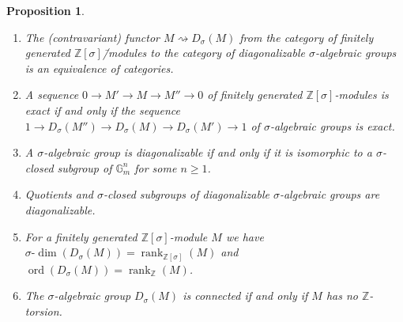\documentclass[oneside,reqno]{amsart}
\newtheorem{prop}[theo]{Proposition}
\theoremstyle{definition}
\newcommand{\sdim}{\sigma\text{-}\dim}
\newcommand{\ord}{\operatorname{ord}}
\newcommand{\s}{\sigma}
\newcommand{\Gm}{\mathbb{G}_m}
\newcommand{\ZZ}{\mathbb{Z}}
\newcommand{\rank}{\operatorname{rank}}
\begin{document}
\begin{prop} \label{prop: all about diagonalizable}\mbox{}
	\begin{enumerate}
		\item The (contravariant) functor $M\rightsquigarrow D_\s(M)$ from the category of finitely generated $\ZZ[\s]$\=/modules to the category of diagonalizable $\s$-algebraic groups is an equivalence of categories.	
		\item A sequence $0\to M'\to M\to M''\to 0$ of finitely generated $\ZZ[\s]$-modules is exact if and only if the sequence $1\to D_\s(M'')\to D_\s(M)\to D_\s(M')\to 1$ of $\s$-algebraic groups is exact. 
		\item A $\s$-algebraic group is diagonalizable if and only if it is isomorphic to a $\s$-closed subgroup of $\Gm^n$ for some $n\geq 1$.
		\item Quotients and $\s$-closed subgroups of diagonalizable $\s$-algebraic groups are diagonalizable.
		\item For a finitely generated $\ZZ[\s]$-module $M$ we have $\sdim(D_\s(M))=\rank_{\ZZ[\s]}(M)$ and $\ord(D_\s(M))=\rank_\ZZ(M)$.
		\item The $\s$-algebraic group $D_\s(M)$ is connected if and only if $M$ has no $\ZZ$-torsion. %
	\end{enumerate}
\end{prop}
\end{document}

